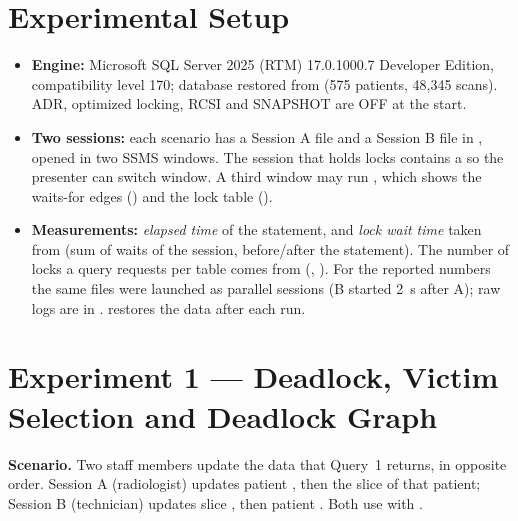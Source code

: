 \section{Experimental Setup}
\label{sec:r5-2-setup}

\begin{itemize}
  \item \textbf{Engine:} Microsoft SQL Server 2025 (RTM) 17.0.1000.7 Developer Edition, compatibility level 170; database restored from  (575 patients, 48{,}345 scans). ADR, optimized locking, RCSI and SNAPSHOT are OFF at the start.
  \item \textbf{Two sessions:} each scenario has a Session A file and a Session B file in , opened in two SSMS windows. The session that holds locks contains a  so the presenter can switch window. A third window may run , which shows the waits-for edges () and the lock table ().
  \item \textbf{Measurements:} \emph{elapsed time} of the statement, and \emph{lock wait time} taken from  (sum of  waits of the session, before/after the statement). The number of locks a query requests per table comes from  (, ). For the reported numbers the same files were launched as parallel  sessions (B started 2~s after A); raw logs are in .  restores the data after each run.
\end{itemize}

\section{Experiment 1 --- Deadlock, Victim Selection and Deadlock Graph}
\label{sec:r5-2-deadlock}

\textbf{Scenario.} Two staff members update the data that Query~1 returns, in opposite order. Session A (radiologist) updates patient , then the slice  of that patient; Session B (technician) updates slice , then patient . Both use  with .

